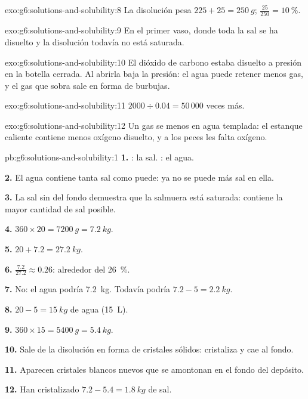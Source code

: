\begin{solution}{exo:g6:solutions-and-solubility:8}
La disolución pesa $225 + 25 = \qty{250}{g}$; $\frac{25}{250} =
\qty{10}{\percent}$.
\end{solution}

\begin{solution}{exo:g6:solutions-and-solubility:9}
En el primer vaso, donde toda la sal se ha disuelto y la disolución
todavía no está saturada.
\end{solution}

\begin{solution}{exo:g6:solutions-and-solubility:10}
El dióxido de carbono estaba disuelto a presión en la botella cerrada.
Al abrirla baja la presión: el agua puede retener menos gas, y el gas
que sobra sale en forma de burbujas.
\end{solution}

\begin{solution}{exo:g6:solutions-and-solubility:11}
$2000 \div 0.04 = 50\,000$ veces más.
\end{solution}

\begin{solution}{exo:g6:solutions-and-solubility:12}
Un gas se  menos en agua templada: el estanque caliente contiene
menos oxígeno disuelto, y a los peces les falta oxígeno.
\end{solution}

\begin{solution}{pb:g6:solutions-and-solubility:1}
\textbf{1.} : la sal. : el agua.

\textbf{2.} El agua contiene tanta sal como puede: ya no se puede
 más sal en ella.

\textbf{3.} La sal sin  del fondo demuestra que la salmuera está
saturada: contiene la mayor cantidad de sal posible.

\textbf{4.} $360 \times 20 = \qty{7200}{g} = \qty{7.2}{kg}$.

\textbf{5.} $20 + 7.2 = \qty{27.2}{kg}$.

\textbf{6.} $\frac{7.2}{27.2} \approx 0.26$: alrededor del
\qty{26}{\percent}.

\textbf{7.} No: el agua podría  \qty{7.2}{kg}. Todavía podría
 $7.2 - 5 = \qty{2.2}{kg}$.

\textbf{8.} $20 - 5 = \qty{15}{kg}$ de agua (\qty{15}{L}).

\textbf{9.} $360 \times 15 = \qty{5400}{g} = \qty{5.4}{kg}$.

\textbf{10.} Sale de la disolución en forma de cristales sólidos:
cristaliza y cae al fondo.

\textbf{11.} Aparecen cristales blancos nuevos que se amontonan en el
fondo del depósito.

\textbf{12.} Han cristalizado $7.2 - 5.4 = \qty{1.8}{kg}$ de sal.
\end{solution}
